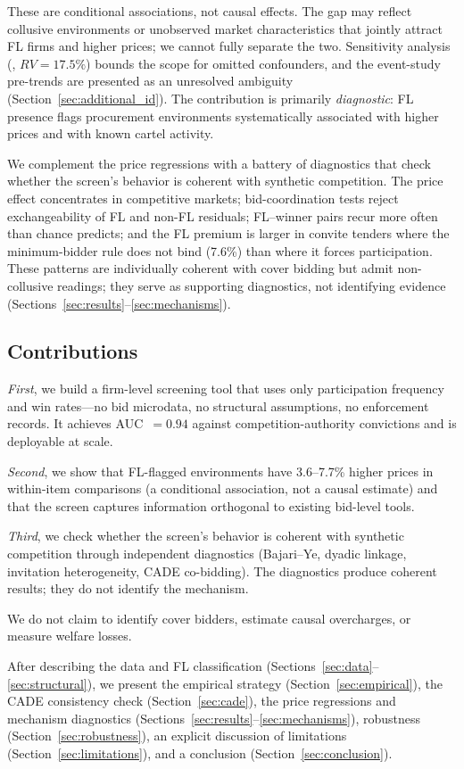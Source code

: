 These are conditional associations, not causal effects. The gap may
reflect collusive environments or unobserved market characteristics
that jointly attract FL firms and higher prices; we cannot fully
separate the two. Sensitivity analysis
(\citealt{cinelli2020making}, $RV = 17.5\%$) bounds the scope for
omitted confounders, and the event-study pre-trends are
presented as an unresolved ambiguity
(Section~\ref{sec:additional_id}). The contribution is primarily
\emph{diagnostic}: FL presence flags procurement environments
systematically associated with higher prices and with known cartel
activity.

We complement the price regressions with a battery of diagnostics
that check whether the screen's behavior is coherent with synthetic
competition. The price effect concentrates in competitive markets;
bid-coordination tests reject exchangeability of FL and non-FL
residuals; FL--winner pairs recur more often than chance predicts;
and the FL premium is larger in convite tenders where the
minimum-bidder rule does not bind (7.6\%) than where it forces
participation. These patterns are individually coherent with cover
bidding but admit non-collusive readings; they serve as supporting
diagnostics, not identifying evidence
(Sections~\ref{sec:results}--\ref{sec:mechanisms}).

\subsection{Contributions}

\emph{First}, we build a firm-level screening tool that uses only
participation frequency and win rates---no bid microdata, no
structural assumptions, no enforcement records. It achieves
AUC~$= 0.94$ against competition-authority convictions and is
deployable at scale.

\emph{Second}, we show that FL-flagged environments have
3.6--7.7\% higher prices in within-item comparisons (a conditional
association, not a causal estimate) and that the screen captures
information orthogonal to existing bid-level tools.

\emph{Third}, we check whether the screen's behavior is coherent with
synthetic competition through independent diagnostics (Bajari--Ye,
dyadic linkage, invitation heterogeneity, CADE co-bidding). The
diagnostics produce coherent results; they do not identify the
mechanism.

We do not claim to identify cover bidders, estimate causal overcharges,
or measure welfare losses.

After describing the data and FL classification
(Sections~\ref{sec:data}--\ref{sec:structural}), we present the
empirical strategy (Section~\ref{sec:empirical}), the CADE
consistency check (Section~\ref{sec:cade}), the price regressions
and mechanism diagnostics
(Sections~\ref{sec:results}--\ref{sec:mechanisms}), robustness
(Section~\ref{sec:robustness}), an explicit discussion of
limitations (Section~\ref{sec:limitations}), and a conclusion
(Section~\ref{sec:conclusion}).
